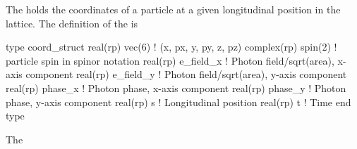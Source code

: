 The  holds the coordinates of a particle at a given
longitudinal position in the lattice. The definition of the
 is
\begin{example}
  type coord_struct
    real(rp) vec(6)       ! (x, px, y, py, z, pz)
    complex(rp) spin(2)   ! particle spin in spinor notation
    real(rp) e_field_x    ! Photon field/sqrt(area), x-axis component
    real(rp) e_field_y    ! Photon field/sqrt(area), y-axis component
    real(rp) phase_x      ! Photon phase, x-axis component
    real(rp) phase_y      ! Photon phase, y-axis component
    real(rp) s            ! Longitudinal position 
    real(rp) t            ! Time
  end type
\end{example}
The \vn{%
(\sref{s:phase.space}) and spin (\sref{s:spin.dyn}). The \vn{%
component gives the absolute s-position of the particle and \vn{%
gives the absolute time.

The \vn{%
tracking and are in units of field/sqrt(cross-section-area). That is,
the square of these units is an intensity. It is up to individual
programs to define an overall scaling factor for the intensity if
desired.

}}}}
